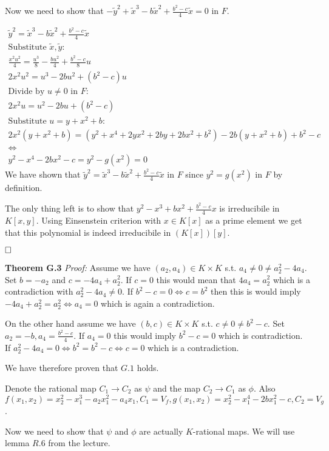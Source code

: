 \documentclass[12pt, a4paper]{article}
\newcommand{\qed}{\hfill\square}
\begin{document}
Now we need to show that $-\tilde{y}^2+\tilde{x}^3-b\tilde{x}^2+\frac{b^2-c}{4}\tilde{x} = 0$ in $F$.

\begin{gather*}
\tilde{y}^2 = \tilde{x}^3-b\tilde{x}^2+\frac{b^2-c}{4}\tilde{x}\\
\text{Substitute $\tilde{x}, \tilde{y}$:}\\
\frac{x^2u^2}{4} = \frac{u^3}{8} - \frac{bu^2}{4} + \frac{b^2-c}{8}u\\
2x^2u^2 = u^3 - 2bu^2 + (b^2-c)u \\
\text{Divide by $u \neq 0$ in $F$:}\\
2x^2u = u^2 - 2bu + (b^2-c)\\
\text{Substitute $u=y+x^2+b$:}\\
2x^2(y+x^2+b) = (y^2+x^4+2yx^2+2by+2bx^2+b^2)-2b(y+x^2+b)+b^2-c\\
\iff\\
y^2-x^4-2bx^2-c = y^2 - g(x^2)= 0
\end{gather*}
We have shown that $\tilde{y}^2 = \tilde{x}^3-b\tilde{x}^2+\frac{b^2-c}{4}\tilde{x}$ in $F$ since $y^2=g(x^2)$ in $F$ by definition.

The only thing left is to show that $y^2-x^3+bx^2+\frac{b^2-c}{4}x$ is irreducibile in $K[x,y]$. Using Einsenstein criterion with $x \in K[x]$ as a prime element we get that this polynomial is indeed irreducibile in $(K[x])[y]$.

$\qed$

\textbf{Theorem G.3} \textit{Proof:}
Assume we have $(a_2, a_4) \in K \times K$ s.t. $a_4 \neq 0 \neq a_2^2-4a_4$. Set $b = -a_2$ and $c = -4a_4+a_2^2$. If $c = 0$ this would mean that $4a_4=a_2^2$ which is a contradiction with $a_2^2-4a_4 \neq 0$. If $b^2-c=0 \iff c=b^2$ then this is would imply $-4a_4+a_2^2 = a_2^2 \iff a_4 = 0$ which is again a contradiction.

On the other hand assume we have $(b,c) \in K \times K$ s.t. $c \neq 0 \neq b^2-c$. Set $a_2 = -b, a_4 = \frac{b^2-c}{4}$. If $a_4 = 0$ this would imply $b^2-c = 0$ which is contradiction. If $a_2^2-4a_4 =0 \iff b^2=b^2-c \iff c = 0$ which is a contradiction.

We have therefore proven that $G.1$ holds.

Denote the rational map $C_1 \rightarrow C_2$ as $\psi$ and the map $C_2 \rightarrow C_1$ as $\phi$. Also $f(x_1,x_2) = x_2^2-x_1^3-a_2x_1^2-a_4x_1, C_1 = V_{f}, g(x_1,x_2) = x_2^2-x_1^4-2bx_1^2-c, C_2 = V_g$.

Now we need to show that $\psi$ and $\phi$ are actually $K$-rational maps. We will use lemma $R.6$ from the lecture. 
\end{document}
